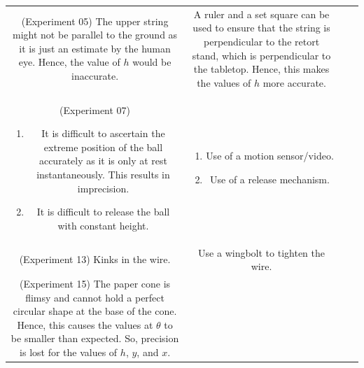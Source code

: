 \documentclass[oneside]{book}
\begin{document}
\begin{itemize}
\begin{longtable}{|Sc|Sc|}
\begin{minipage}{0.5\textwidth-25.2pt}
        \end{minipage}\\
        \hline
        \begin{minipage}{0.5\textwidth-25.2pt}
            (Experiment 05) The upper string might not be parallel to the ground as it is just an estimate by the human eye. Hence, the value of \(h\) would be inaccurate.
        \end{minipage}&
        \begin{minipage}{0.5\textwidth-25.2pt}
            A ruler and a set square can be used to ensure that the string is perpendicular to the retort stand, which is perpendicular to the tabletop. Hence, this makes the values of \(h\) more accurate.
        \end{minipage}\\
        \hline
        \begin{minipage}{0.5\textwidth-25.2pt}
            (Experiment 07) 
            \begin{enumerate}
                \item It is difficult to ascertain the extreme position of the ball accurately as it is only at rest instantaneously. This results in imprecision.
                \item It is difficult to release the ball with constant height.
            \end{enumerate}
        \end{minipage}&
        \begin{minipage}{0.5\textwidth-25.2pt}
            \begin{enumerate}
                \item Use of a motion sensor/video.
                \item Use of a release mechanism.
            \end{enumerate}
        \end{minipage}\\
        \hline
        \begin{minipage}{0.5\textwidth-25.2pt}
            (Experiment 13) Kinks in the wire.
        \end{minipage} & 
        \begin{minipage}{0.5\textwidth-25.2pt}
            Use a wingbolt to tighten the wire.
        \end{minipage}\\
        \hline
        \begin{minipage}{0.5\textwidth-25.2pt}
            (Experiment 15) The paper cone is flimsy and cannot hold a perfect circular shape at the base of the cone. Hence, this causes the values at \(\theta\) to be smaller than expected. So, precision is lost for the values of \(h\), \(y\), and \(x\).

\end{minipage}
\end{longtable}
\end{itemize}
\end{document}
